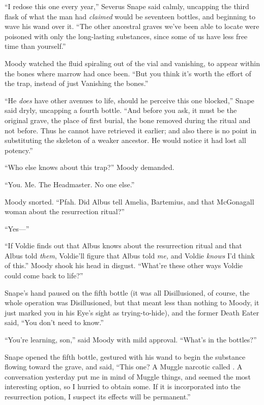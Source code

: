 “I redose this one every year,” Severus Snape said calmly, uncapping the third flask of what the man had \emph{claimed} would be seventeen bottles, and beginning to wave his wand over it. “The other ancestral graves we’ve been able to locate were poisoned with only the long-lasting substances, since some of us have less free time than yourself.”

Moody watched the fluid spiraling out of the vial and vanishing, to appear within the bones where marrow had once been. “But you think it’s worth the effort of the trap, instead of just Vanishing the bones.”

“He \emph{does} have other avenues to life, should he perceive this one blocked,” Snape said dryly, uncapping a fourth bottle. “And before you ask, it must be the original grave, the place of first burial, the bone removed during the ritual and not before. Thus he cannot have retrieved it earlier; and also there is no point in substituting the skeleton of a weaker ancestor. He would notice it had lost all potency.”

“Who else knows about this trap?” Moody demanded.

“You. Me. The Headmaster. No one else.”

Moody snorted. “Pfah. Did Albus tell Amelia, Bartemius, and that McGonagall woman about the resurrection ritual?”

“Yes—”

“If Voldie finds out that Albus knows about the resurrection ritual and that Albus told \emph{them}, Voldie’ll figure that Albus told \emph{me,} and Voldie \emph{knows} I’d think of this.” Moody shook his head in disgust. “What’re these other ways Voldie could come back to life?”

Snape’s hand paused on the fifth bottle (it was all Disillusioned, of course, the whole operation was Disillusioned, but that meant less than nothing to Moody, it just marked you in his Eye’s sight as trying-to-hide), and the former Death Eater said, “You don’t need to know.”

“You’re learning, son,” said Moody with mild approval. “What’s in the bottles?”

Snape opened the fifth bottle, gestured with his wand to begin the substance flowing toward the grave, and said, “This one? A Muggle narcotic called . A conversation yesterday put me in mind of Muggle things, and  seemed the most interesting option, so I hurried to obtain some. If it is incorporated into the resurrection potion, I suspect its effects will be permanent.”

